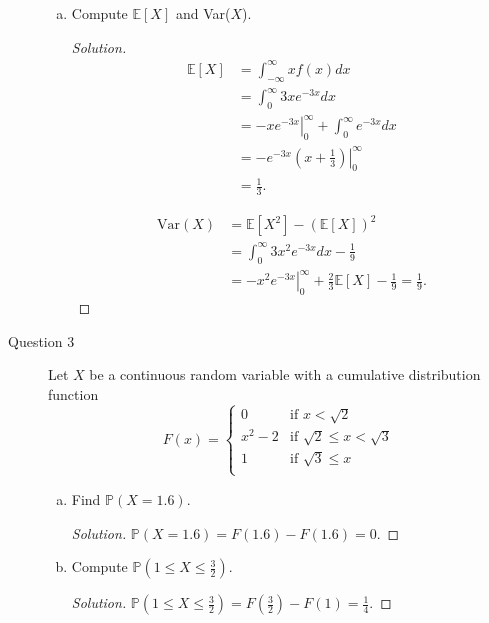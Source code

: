 \documentclass[addpoints, 11pt]{exam}
\newcommand*{\p}{\mathds{P}}
\newcommand*{\E}{\mathds{E}}
\begin{document}
\begin{description}
\begin{enumerate}[(a)]
        \item Compute $\E[X]$ and Var($X$).
        \begin{proof}[Solution]
            \begin{align*}
                \E[X] 
                &= \int^{\infty}_{-\infty} xf(x) dx \\
                &= \int^{\infty}_{0} 3xe^{-3x} dx \\
                &= \left.-xe^{-3x}\right|^{\infty}_0 + \int^{\infty}_{0} e^{-3x} dx \\
                &= -e^{-3x}\left.\left(x + \frac{1}{3}\right)\right|^{\infty}_0 \\
                &= \frac{1}{3}.
            \end{align*}

            \begin{align*}
                \text{Var}(X) 
                &= \E[X^2] - (\E[X])^2 \\
                &= \int^{\infty}_{0} 3x^2e^{-3x} dx - \frac{1}{9} \\
                &= \left.-x^2e^{-3x}\right|^{\infty}_0 + \frac{2}{3}\E[X] - \frac{1}{9} = \frac{1}{9}.
            \end{align*}
        \end{proof}
    \end{enumerate}

    \newpage

    \item[Question 3] Let $X$ be a continuous random variable with a cumulative distribution function
    \[
        F(x) = \begin{cases}
            0 & \text{if }x < \sqrt{2} \\
            x^2 - 2 & \text{if }\sqrt{2} \leq x < \sqrt{3} \\
            1 & \text{if }\sqrt{3} \leq x \\
        \end{cases}
    \]
    \begin{enumerate}[(a)]
        \item Find $\p(X = 1.6)$.
        \begin{proof}[Solution]
            $\p(X = 1.6) = F(1.6) - F(1.6) = 0$.
        \end{proof}

        \item Compute $\p(1 \leq X \leq \frac{3}{2})$.
        \begin{proof}[Solution]
            $\p(1 \leq X \leq \frac{3}{2}) = F(\frac{3}{2}) - F(1) = \frac{1}{4}$.
        \end{proof}


\end{enumerate}
\end{description}
\end{document}
